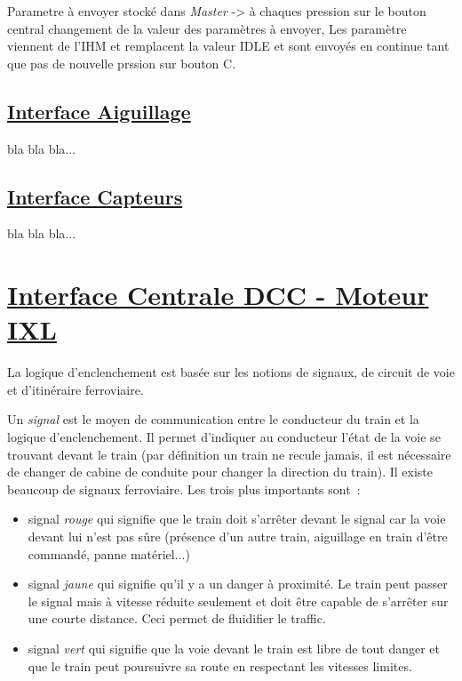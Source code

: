 Parametre à envoyer stocké dans \emph{Master}\hfill\linebreak
-> à chaques pression sur le bouton central changement de la valeur\linebreak
des paramètres à envoyer, Les paramètre viennent de l'IHM et\linebreak
remplacent la valeur IDLE et sont envoyés en continue tant que pas de\linebreak
nouvelle prssion sur bouton C.\linebreak
\bigskip

\subsection{\underline{Interface Aiguillage}}
\label{sec:int_aig}

bla bla bla...

\subsection{\underline{Interface Capteurs}}
\label{sec:int_cap}

bla bla bla...


\newpage
\section{\underline{Interface Centrale DCC - Moteur IXL}}
\label{sec:int_ixl}   

La logique d'enclenchement est basée sur les notions de signaux, de circuit de voie et d'itinéraire ferroviaire.

Un \emph{signal} est le moyen de communication entre le conducteur du train et la logique d'enclenchement. 
Il permet d'indiquer au conducteur l'état de la voie se trouvant devant le train (par définition un 
train ne recule jamais, il est nécessaire de changer de cabine de conduite pour changer
la direction du train). Il existe beaucoup de signaux ferroviaire. Les trois plus importants sont~:
\begin{itemize}
\item signal \emph{rouge} qui signifie que le train doit s'arrêter devant le signal car la
voie devant lui n'est pas sûre (présence d'un autre train, aiguillage en train d'être commandé, panne 
matériel...)
\item signal \emph{jaune} qui signifie qu'il y a un danger à proximité. Le train peut passer le signal
mais à vitesse réduite seulement et doit être capable de s'arrêter sur une courte distance. Ceci permet 
de fluidifier le traffic.
\item signal \emph{vert} qui signifie que la voie devant le train est libre de tout danger et que le train 
peut poursuivre sa route en respectant les vitesses limites.
\end{itemize}


